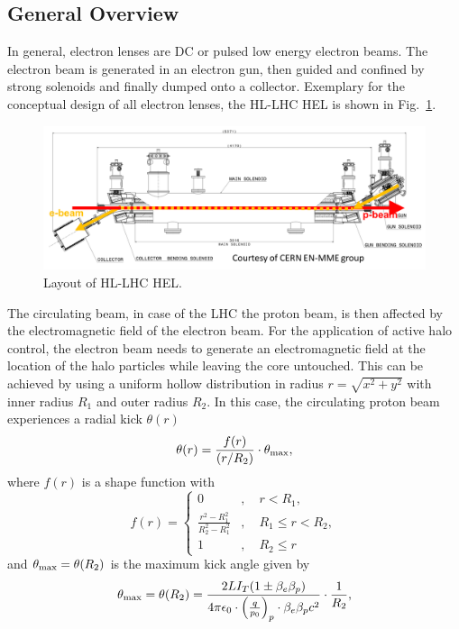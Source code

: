 \documentclass[%
 reprint,
 amsmath,amssymb,
 aps,
prstab,
]{revtex4-1}
\begin{document}
\subsection{General Overview\label{sec:hel:intro}}
In general, electron lenses are DC or pulsed low energy electron beams. The electron beam is generated in an electron gun, then guided and confined by strong solenoids and finally dumped onto a collector. Exemplary for the conceptual design of all electron lenses, the HL-LHC HEL is shown in Fig.~\ref{fig:hel_layout}.
\begin{figure}[h]
	\includegraphics[width=1.0\linewidth]{hel_layout_epbeam}%
	\caption{\label{fig:hel_layout} Layout of HL-LHC HEL.}
\end{figure}
The circulating beam, in case of the LHC the proton beam, is then affected by the electromagnetic field of the electron beam. For the application of active halo control, the electron beam needs to generate an electromagnetic field at the location of the halo particles while leaving the core untouched. This can be achieved by using a uniform hollow distribution in radius $r=\sqrt{x^2+y^2}$ with inner radius $R_1$ and outer radius $R_2$. In this case, the circulating proton beam experiences a radial kick $\theta(r)$
\begin{equation}\label{eq:field_1}
\theta(r)=\frac{f(r)}{(r/R_2)}\cdot \theta_{\rm max},
\end{equation}
where $f(r)$ is a shape function with
\begin{equation}\label{eq:field_2}
f(r) =
\begin{cases} 0 &,\quad r< R_1,\\
\frac{r^2-R_1^2}{R_2^2-R_1^2} &,\quad R_1 \leq r < R_2,\\
1 &,\quad R_2 \leq r
\end{cases}
\end{equation}
and $\theta_{\rm max}=\theta(R_2)$ is the maximum kick angle given by
\begin{equation}
\theta_{\rm max} = \theta(R_2) = \frac{2LI_T(1\pm\beta_e\beta_p)}{4\pi\epsilon_0  \cdot \left(\frac{q}{p_0}\right)_p \cdot \beta_e\beta_p c^2}\cdot\frac{1}{R_2},
\end{equation}
\end{document}
